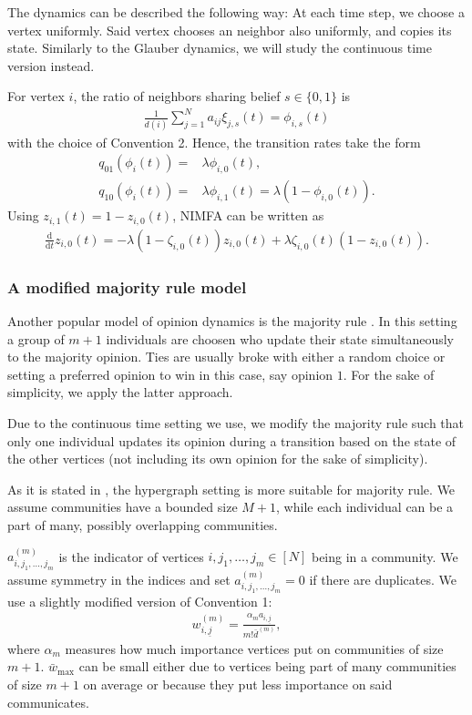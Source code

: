 \documentclass{article}
\newcommand{\ul}{\underline}
\renewcommand{\d}{\mathrm{d}}
\newcommand{\1}[1]{{\mathds{1}}_{\left\{#1\right\}}}
\newcommand{\remm}[1]{{#1}}
\begin{document}
	The dynamics can be described the following way: At each time step, we choose a vertex uniformly. Said vertex chooses an neighbor also uniformly, and copies its state. Similarly to the Glauber dynamics, we will study the continuous time version instead.
	
	For vertex $i$, the ratio of neighbors sharing belief $s \in \{0,1\}$ is 
	\begin{align*}
	\frac{1}{d(i)}\sum_{j=1}^N a_{ij} \xi_{j,s}(t)=\phi_{i,s}(t)
	\end{align*}	    
	with the choice of Convention 2. Hence, the transition rates take the form
	\begin{align*}
	q_{01}(\phi_i(t))=&\lambda \phi_{i,0}(t), \\
	q_{10}(\phi_{i}(t))=& \lambda \phi_{i,1}(t)=\lambda\left(1-\phi_{i,0}(t)\right).
	\end{align*}
	Using $z_{i,1}(t)=1-z_{i,0}(t)$, NIMFA can be written as
	\begin{align*}
	\frac{\d}{\d t}z_{i,0}(t)=-\lambda (1-\zeta_{i,0}(t))z_{i,0}(t)+\lambda \zeta_{i,0}(t)\left(1-z_{i,0}(t)\right).
	\end{align*}
	
	\subsubsection*{A modified majority rule model}
	
	Another popular model of opinion dynamics is the majority rule \cite{voter_majority}. In this setting a group of $m+1$ individuals are choosen who update their state simultaneously to the majority opinion. Ties are usually broke with either a random choice or setting a preferred opinion to win in this case, say opinion $1$. For the sake of simplicity, we apply the latter approach.
	
	Due to the continuous time setting we use, we modify the majority rule such that only one individual updates its opinion during a transition based on the state of the other vertices (not including its own opinion for the sake of simplicity).
	
	As it is stated in \cite{voter_majority}, the hypergraph setting is more suitable for majority rule. We assume communities have a bounded size $M+1$, while each individual can be a part of many, possibly overlapping communities. 
	
	$a_{i,j_1,\dots,j_m}^{(m)}$ is the indicator of vertices $i, j_1, \dots, j_m \in [N]$ being in a community. We assume symmetry in the indices and set $a_{i,j_1,\dots,j_m}^{(m)}=0$ if there are duplicates. We use a slightly modified version of Convention 1:
	\begin{align*}
	w_{i,\ul{j}}^{(m)}=\frac{\alpha_m a_{i,\ul{j}}}{m! \bar{d}^{(m)}},
	\end{align*}
	where $\alpha_m$ measures how much importance vertices put on communities of size $m+1$. $\remm{\bar{w}_{\textrm{max}}}$ can be small either due to vertices being part of many communities of size $m+1$ on average or because they put less importance on said communicates.
	
\end{document}
